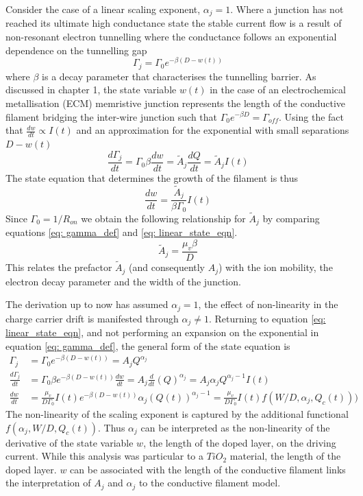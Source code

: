 Consider the case of a linear scaling exponent, $\alpha_j = 1$. Where a junction has not reached its ultimate high conductance state the stable current flow is a result of non-resonant electron tunnelling where the conductance follows an exponential dependence on the tunnelling gap
\begin{equation}
\Gamma_j = \Gamma_0 e^{-\beta (D - w(t))}
\label{eq: gamma_def}
\end{equation}
where $\beta$ is a decay parameter that characterises the tunnelling barrier. As discussed in chapter 1, the state variable $w(t)$ in the case of an electrochemical metallisation (ECM) memristive junction represents the length of the conductive filament bridging the inter-wire junction such that $\Gamma_0 e^{-\beta D} = \Gamma_{off}$. Using the fact that $\frac{dw}{dt} \propto I(t)$ and an approximation for the exponential with small separations $D-w(t)$
\begin{equation}
\frac{d \Gamma_j}{dt} = \Gamma_0 \beta \frac{dw}{dt} = \tilde{A}_j \frac{dQ}{dt} = \tilde{A}_j I(t)
\label{eq: linear_state_eqn}
\end{equation}
The state equation that determines the growth of the filament is thus
\begin{equation}
\frac{dw}{dt} = \frac{\tilde{A}_j}{\beta \Gamma_0} I(t)
\end{equation}
Since $\Gamma_0 = 1/R_{on}$ we obtain the following relationship for $\tilde{A}_j$ by comparing equations \ref{eq: gamma_def} and \ref{eq: linear_state_eqn}.
\begin{equation}
\tilde{A}_j = \frac{\mu_v \beta}{D}
\end{equation}
This relates the prefactor $\tilde{A}_j$ (and consequently $A_j$) with the ion mobility, the electron decay parameter and the width of the junction.

The derivation up to now has assumed $\alpha_j = 1$, the effect of non-linearity in the charge carrier drift is manifested through $\alpha_j \neq 1$. Returning to equation \ref{eq: linear_state_eqn}, and not performing an expansion on the exponential in equation \ref{eq: gamma_def}, the general form of the state equation is
\begin{align}
\Gamma_j &= \Gamma_0 e^{-\beta (D - w(t))} = A_j Q^{\alpha_j} \nonumber \\
\frac{d \Gamma_j}{dt} &= \Gamma_0 \beta e^{-\beta(D - w(t))} \frac{dw}{dt}  = A_j \frac{d}{dt}(Q)^{\alpha_j} = A_j \alpha_j Q^{\alpha_j-1} I(t) \nonumber \\
\frac{dw}{dt} & = \frac{\mu_v}{D \Gamma_0} I(t) e^{-\beta(D - w(t))} \alpha_j (Q(t))^{\alpha_j -1}  =  \frac{\mu_v}{D \Gamma_0} I(t) f(W/D, \alpha_j, Q_c(t)))
\end{align}
The non-linearity of the scaling exponent is captured by the additional functional $f(\alpha_j,W/D, Q_c(t))$. Thus $\alpha_j$ can be interpreted as the non-linearity of the derivative of the state variable $w$, the length of the doped layer, on the driving current. While this analysis was particular to a $TiO_2$ material, the length of the doped layer. $w$ can be associated with the length of the conductive filament links the interpretation of $A_j$ and $\alpha_j$ to the conductive filament model.

